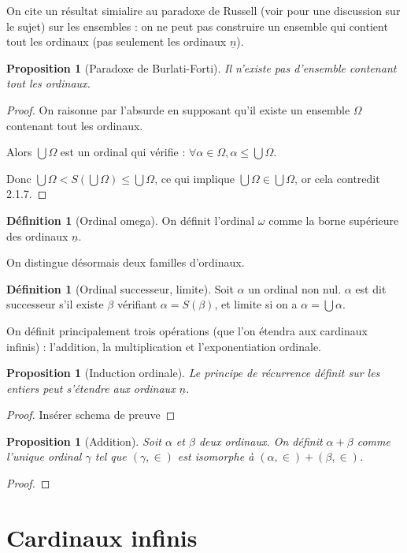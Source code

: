 \documentclass{article}
\theoremstyle{definition}
\newtheorem{definition}[subsubsection]{Définition}
\theoremstyle{plain}
\newtheorem{proposition}[subsubsection]{Proposition}
\theoremstyle{plain}
\theoremstyle{plain}
\theoremstyle{plain}
\begin{document}
\par On cite un résultat simialire au paradoxe de Russell (voir \cite{dumoncel2002philosophie} pour une discussion sur le sujet) sur les ensembles : on ne peut pas construire un ensemble qui contient tout les ordinaux (pas seulement les ordinaux \( \underline{n} \)).
\begin{proposition}[Paradoxe de Burlati-Forti]
	Il n'existe pas d'ensemble contenant tout les ordinaux.
\end{proposition}
\begin{proof}
	On raisonne par l'absurde en supposant qu'il existe un ensemble \( \Omega \) contenant tout les ordinaux.
	
	Alors \( \bigcup \Omega \) est un ordinal qui vérifie : \( \forall \alpha \in \Omega, \alpha \le \bigcup \Omega \). 

	Donc \( \bigcup\Omega < S(\bigcup\Omega) \le \bigcup\Omega \), ce qui implique \( \bigcup\Omega \in \bigcup\Omega \), or cela contredit 2.1.7.
\end{proof}\begin{definition}[Ordinal omega]
	On définit l'ordinal \( \omega \) comme la borne supérieure des ordinaux \( \underline{n} \).
\end{definition}

\par On distingue désormais deux familles d'ordinaux.
\begin{definition}[Ordinal successeur, limite]
	Soit \( \alpha \) un ordinal non nul. \( \alpha \) est dit successeur s'il existe \( \beta \) vérifiant \( \alpha = S(\beta) \), et limite si on a \( \alpha = \bigcup \alpha \).
\end{definition}

\par On définit principalement trois opérations (que l'on étendra aux cardinaux infinis) : l'addition, la multiplication et l'exponentiation ordinale.
\begin{proposition}[Induction ordinale]
	Le principe de récurrence définit sur les entiers peut s'étendre aux ordinaux \( \underline{n} \).
\end{proposition}
\begin{proof}
	Insérer schema de preuve
\end{proof}
\begin{proposition}[Addition]
	Soit \( \alpha \) et \( \beta \) deux ordinaux. 
	On définit \( \alpha + \beta \) comme l'unique ordinal \( \gamma \) tel que \( (\gamma,\in) \) est isomorphe à \( (\alpha,\in) + (\beta,\in) \).
\end{proposition}
\begin{proof}
	
\end{proof}

\clearpage
\section{Cardinaux infinis}

\clearpage
\printbibliography
\end{document}

